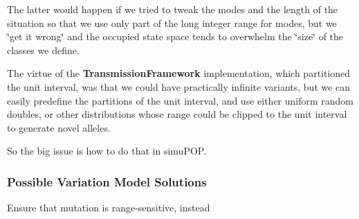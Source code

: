 The latter would happen if we tried to tweak the modes and the length of the situation so that we use only part of the long integer range for modes, but we \char`\"{}get it wrong\char`\"{} and the occupied state space tends to overwhelm the \char`\"{}size\char`\"{} of the classes we define.

The virtue of the {\bfseries Transmission\-Framework} implementation, which partitioned the unit interval, was that we could have practically infinite variants, but we can easily predefine the partitions of the unit interval, and use either uniform random doubles, or other distributions whose range could be clipped to the unit interval to generate novel alleles.

So the big issue is how to do that in simu\-P\-O\-P.

\subsubsection*{Possible Variation Model Solutions}


\begin{DoxyEnumerate}
\item Ensure that mutation is range-\/sensitive, instead 
\end{DoxyEnumerate}